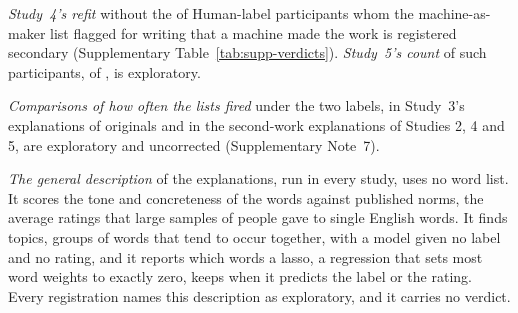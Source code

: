 \emph{Study~4's refit} without the \SFourMachineMadeN{} of \SFourMachineMadeNHuman{} Human-label participants whom the machine-as-maker list flagged for writing that a machine made the work is registered secondary (Supplementary Table~\ref{tab:supp-verdicts}). \emph{Study~5's count} of such participants, \SFiveMachineMadeN{} of \SFiveMachineMadeNHuman, is exploratory.

\emph{Comparisons of how often the lists fired} under the two labels, in Study~3's explanations of originals and in the second-work explanations of Studies 2, 4 and 5, are exploratory and uncorrected (Supplementary Note~7).

\emph{The general description} of the explanations, run in every study, uses no word list. It scores the tone and concreteness of the words against published norms, the average ratings that large samples of people gave to single English words.\cite{warriner2013norms,brysbaert2014concreteness} It finds topics, groups of words that tend to occur together, with a model given no label and no rating, and it reports which words a lasso, a regression that sets most word weights to exactly zero, keeps when it predicts the label or the rating. Every registration names this description as exploratory, and it carries no verdict.
